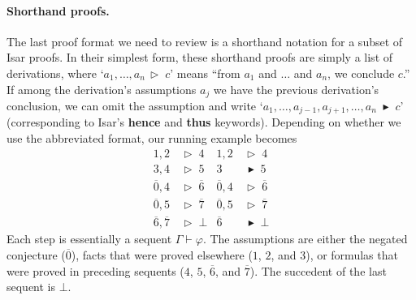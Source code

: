\documentclass[withtimes,a4paper,12pt]{easychair}
\newcommand\keyw[1]{\textsf{\textbf{#1}}}
\let\B=\overline
\newcommand\have{\mathrel{\,\vartriangleright\;}}
\newcommand\hencesym{\blacktriangleright}
\newcommand\hence{\mathrel{\;\hencesym\;}}
\begin{document}
\paragraph{Shorthand proofs.}
The last proof format we need to review is a shorthand notation for a subset of
Isar proofs. In their simplest form, these shorthand proofs are simply a list of
derivations, where `$a_1, \ldots, a_n \have c$' means ``from $a_1$ and $\ldots$
and $a_n$, we conclude $c$.'' If among the derivation's assumptions $a_j$
we have the previous derivation's conclusion, we can omit the assumption
and write `$a_1, \ldots, a_{j-1}, a_{j+1}, \ldots, a_n \hence c$' (corresponding
to Isar's \keyw{hence} and \keyw{thus} keywords). Depending on whether we use
the abbreviated format, our running example becomes
%
\begin{align*}
1, 2 & \have 4 &
    1, 2 & \have 4 \\
3, 4 & \have 5 &
    3 & \hence 5 \\
\B{0}, 4 & \have \B{6} &
    \B{0}, 4 & \have \B{6} \\
\B{0}, 5 & \have \B{7} &
    \B{0}, 5 & \have \B{7} \\
\B{6}, \B{7} & \have \bot &
    \B{6} & \hence \bot
\end{align*}
%
Each step is essentially a sequent $\Gamma \vdash \varphi$. The assumptions are
either the negated conjecture ($\B{0}$), facts that were proved elsewhere ($1$,
$2$, and $3$), or formulas that were proved in preceding sequents ($4$, $5$,
$\B{6}$, and $\B{7}$). The succedent of the last sequent is $\bot$.
\end{document}
